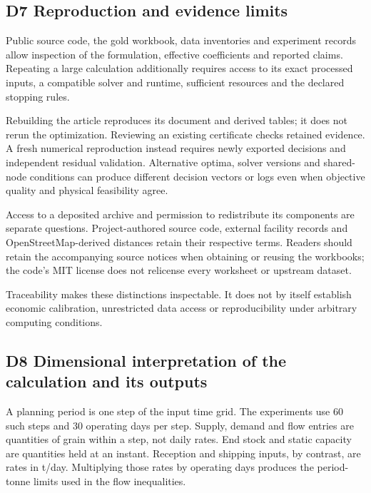 \documentclass[
  english,
  11pt,
  a4paper,
]{article}
\begin{document}
\subsection{D7 Reproduction and evidence
limits}\label{d7-reproduction-and-evidence-limits}

Public source code, the gold workbook, data inventories and experiment
records allow inspection of the formulation, effective coefficients and
reported claims. Repeating a large calculation additionally requires
access to its exact processed inputs, a compatible solver and runtime,
sufficient resources and the declared stopping rules.

Rebuilding the article reproduces its document and derived tables; it
does not rerun the optimization. Reviewing an existing certificate
checks retained evidence. A fresh numerical reproduction instead
requires newly exported decisions and independent residual validation.
Alternative optima, solver versions and shared-node conditions can
produce different decision vectors or logs even when objective quality
and physical feasibility agree.

Access to a deposited archive and permission to redistribute its
components are separate questions. Project-authored source code,
external facility records and OpenStreetMap-derived distances retain
their respective terms. Readers should retain the accompanying source
notices when obtaining or reusing the workbooks; the code's MIT license
does not relicense every worksheet or upstream dataset.

Traceability makes these distinctions inspectable. It does not by itself
establish economic calibration, unrestricted data access or
reproducibility under arbitrary computing conditions.

\subsection{D8 Dimensional interpretation of the calculation and its
outputs}\label{d8-dimensional-interpretation-of-the-calculation-and-its-outputs}

A planning period is one step of the input time grid. The experiments
use 60 such steps and 30 operating days per step. Supply, demand and
flow entries are quantities of grain within a step, not daily rates. End
stock and static capacity are quantities held at an instant. Reception
and shipping inputs, by contrast, are rates in t/day. Multiplying those
rates by operating days produces the period-tonne limits used in the
flow inequalities.
\end{document}
